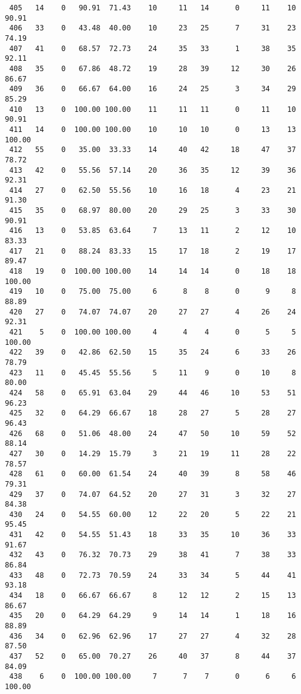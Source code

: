 \begin{verbatim}
 405   14    0   90.91  71.43    10     11   14      0     11    10    90.91
 406   33    0   43.48  40.00    10     23   25      7     31    23    74.19
 407   41    0   68.57  72.73    24     35   33      1     38    35    92.11
 408   35    0   67.86  48.72    19     28   39     12     30    26    86.67
 409   36    0   66.67  64.00    16     24   25      3     34    29    85.29
 410   13    0  100.00 100.00    11     11   11      0     11    10    90.91
 411   14    0  100.00 100.00    10     10   10      0     13    13   100.00
 412   55    0   35.00  33.33    14     40   42     18     47    37    78.72
 413   42    0   55.56  57.14    20     36   35     12     39    36    92.31
 414   27    0   62.50  55.56    10     16   18      4     23    21    91.30
 415   35    0   68.97  80.00    20     29   25      3     33    30    90.91
 416   13    0   53.85  63.64     7     13   11      2     12    10    83.33
 417   21    0   88.24  83.33    15     17   18      2     19    17    89.47
 418   19    0  100.00 100.00    14     14   14      0     18    18   100.00
 419   10    0   75.00  75.00     6      8    8      0      9     8    88.89
 420   27    0   74.07  74.07    20     27   27      4     26    24    92.31
 421    5    0  100.00 100.00     4      4    4      0      5     5   100.00
 422   39    0   42.86  62.50    15     35   24      6     33    26    78.79
 423   11    0   45.45  55.56     5     11    9      0     10     8    80.00
 424   58    0   65.91  63.04    29     44   46     10     53    51    96.23
 425   32    0   64.29  66.67    18     28   27      5     28    27    96.43
 426   68    0   51.06  48.00    24     47   50     10     59    52    88.14
 427   30    0   14.29  15.79     3     21   19     11     28    22    78.57
 428   61    0   60.00  61.54    24     40   39      8     58    46    79.31
 429   37    0   74.07  64.52    20     27   31      3     32    27    84.38
 430   24    0   54.55  60.00    12     22   20      5     22    21    95.45
 431   42    0   54.55  51.43    18     33   35     10     36    33    91.67
 432   43    0   76.32  70.73    29     38   41      7     38    33    86.84
 433   48    0   72.73  70.59    24     33   34      5     44    41    93.18
 434   18    0   66.67  66.67     8     12   12      2     15    13    86.67
 435   20    0   64.29  64.29     9     14   14      1     18    16    88.89
 436   34    0   62.96  62.96    17     27   27      4     32    28    87.50
 437   52    0   65.00  70.27    26     40   37      8     44    37    84.09
 438    6    0  100.00 100.00     7      7    7      0      6     6   100.00

\end{verbatim}
